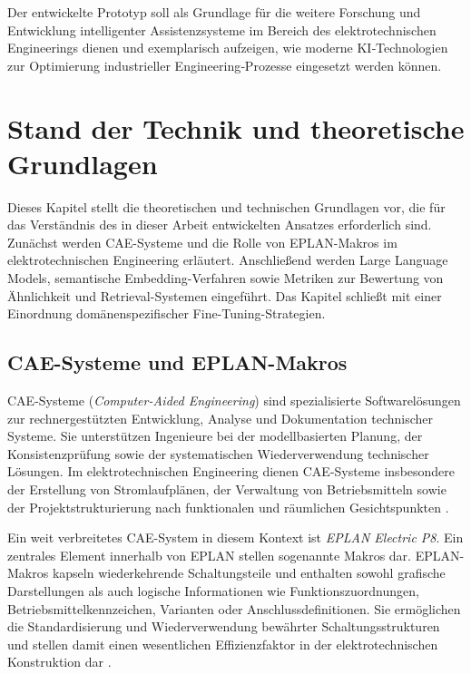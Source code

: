 Der entwickelte Prototyp soll als Grundlage für die weitere Forschung und Entwicklung intelligenter Assistenzsysteme im Bereich des elektrotechnischen Engineerings dienen und exemplarisch aufzeigen, wie moderne KI‑Technologien zur Optimierung industrieller Engineering‑Prozesse eingesetzt werden können.

\chapter{Stand der Technik und theoretische Grundlagen}

Dieses Kapitel stellt die theoretischen und technischen Grundlagen vor, die für das Verständnis des in dieser Arbeit entwickelten Ansatzes erforderlich sind. Zunächst werden CAE-Systeme und die Rolle von EPLAN-Makros im elektrotechnischen Engineering erläutert. Anschließend werden Large Language Models, semantische Embedding-Verfahren sowie Metriken zur Bewertung von Ähnlichkeit und Retrieval-Systemen eingeführt. Das Kapitel schließt mit einer Einordnung domänenspezifischer Fine-Tuning-Strategien.

\section{CAE-Systeme und EPLAN-Makros}

CAE-Systeme (\emph{Computer-Aided Engineering}) sind spezialisierte Softwarelösungen zur rechnergestützten Entwicklung, Analyse und Dokumentation technischer Systeme. Sie unterstützen Ingenieure bei der modellbasierten Planung, der Konsistenzprüfung sowie der systematischen Wiederverwendung technischer Lösungen. Im elektrotechnischen Engineering dienen CAE-Systeme insbesondere der Erstellung von Stromlaufplänen, der Verwaltung von Betriebsmitteln sowie der Projektstrukturierung nach funktionalen und räumlichen Gesichtspunkten \cite{khanolkar_mapping_2023}. 

Ein weit verbreitetes CAE-System in diesem Kontext ist \emph{EPLAN Electric P8}. Ein zentrales Element innerhalb von EPLAN stellen sogenannte Makros dar. EPLAN-Makros kapseln wiederkehrende Schaltungsteile und enthalten sowohl grafische Darstellungen als auch logische Informationen wie Funktionszuordnungen, Betriebsmittelkennzeichen, Varianten oder Anschlussdefinitionen. Sie ermöglichen die Standardisierung und Wiederverwendung bewährter Schaltungsstrukturen und stellen damit einen wesentlichen Effizienzfaktor in der elektrotechnischen Konstruktion dar \cite{mustafa_optimizing_2025}.

